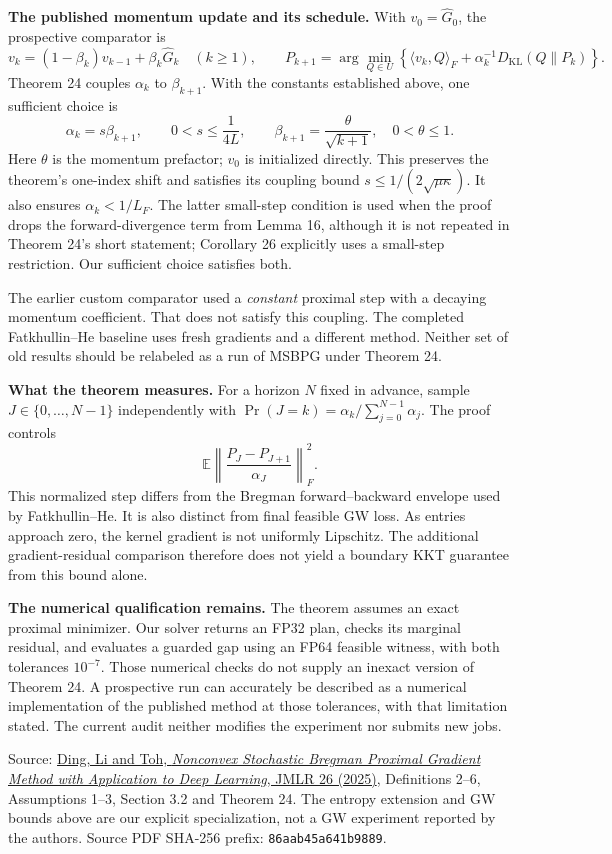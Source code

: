 \documentclass[11pt,a4paper]{article}
\newcommand{\KL}{D_{\mathrm{KL}}}
\begin{document}
\textbf{The published momentum update and its schedule.}
With $v_0=\widehat G_0$, the prospective comparator is
\[
 v_k=(1-\beta_k)v_{k-1}+\beta_k\widehat G_k\quad(k\geq1),\qquad
 P_{k+1}=\arg\min_{Q\in U}
 \left\{\langle v_k,Q\rangle_F+\alpha_k^{-1}\KL(Q\|P_k)\right\}.
\]
Theorem 24 couples $\alpha_k$ to $\beta_{k+1}$. With the constants established above, one sufficient choice is
\[
 \alpha_k=s\beta_{k+1},\qquad 0<s\leq\frac1{4L},\qquad
 \beta_{k+1}=\frac{\theta}{\sqrt{k+1}},\quad 0<\theta\leq1.
\]
Here $\theta$ is the momentum prefactor; $v_0$ is initialized directly. This preserves the theorem's one-index shift and satisfies its coupling bound $s\leq1/(2\sqrt{\mu\kappa})$. It also ensures $\alpha_k<1/L_F$. The latter small-step condition is used when the proof drops the forward-divergence term from Lemma 16, although it is not repeated in Theorem 24's short statement; Corollary 26 explicitly uses a small-step restriction. Our sufficient choice satisfies both.

The earlier custom comparator used a \emph{constant} proximal step with a decaying momentum coefficient. That does not satisfy this coupling. The completed Fatkhullin--He baseline uses fresh gradients and a different method. Neither set of old results should be relabeled as a run of MSBPG under Theorem 24.

\textbf{What the theorem measures.}
For a horizon $N$ fixed in advance, sample $J\in\{0,\ldots,N-1\}$ independently with
$\Pr(J=k)=\alpha_k/\sum_{j=0}^{N-1}\alpha_j$. The proof controls
\[
 \mathbb E\left\|\frac{P_J-P_{J+1}}{\alpha_J}\right\|_F^2.
\]
This normalized step differs from the Bregman forward--backward envelope used by Fatkhullin--He. It is also distinct from final feasible GW loss. As entries approach zero, the kernel gradient is not uniformly Lipschitz. The additional gradient-residual comparison therefore does not yield a boundary KKT guarantee from this bound alone.

\textbf{The numerical qualification remains.}
The theorem assumes an exact proximal minimizer. Our solver returns an FP32 plan, checks its marginal residual, and evaluates a guarded gap using an FP64 feasible witness, with both tolerances $10^{-7}$. Those numerical checks do not supply an inexact version of Theorem 24. A prospective run can accurately be described as a numerical implementation of the published method at those tolerances, with that limitation stated. The current audit neither modifies the experiment nor submits new jobs.

\vfill
{\small Source: \href{https://www.jmlr.org/papers/volume26/23-0657/23-0657.pdf}{Ding, Li and Toh, \emph{Nonconvex Stochastic Bregman Proximal Gradient Method with Application to Deep Learning}, JMLR 26 (2025)}, Definitions 2--6, Assumptions 1--3, Section 3.2 and Theorem 24. The entropy extension and GW bounds above are our explicit specialization, not a GW experiment reported by the authors. Source PDF SHA-256 prefix: \texttt{86aab45a641b9889}.}
\end{document}
